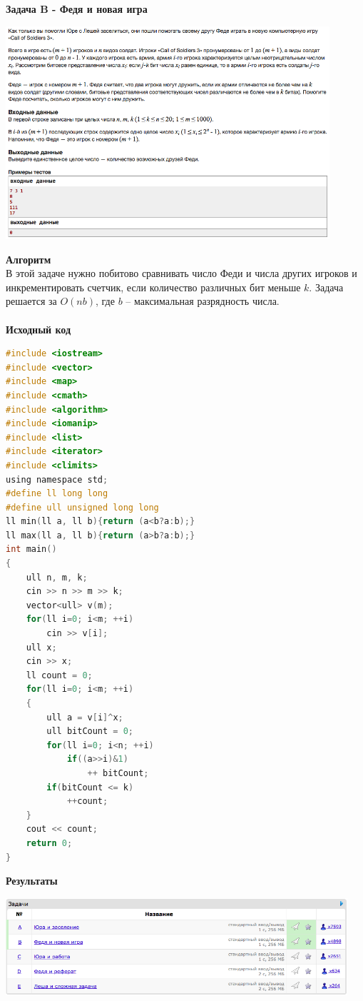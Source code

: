 \documentclass[a4paper,12pt]{article}
\begin{document}
\newpage
\textbf{{\large Задача B - Федя и новая игра}} \\
\begin{center}
\includegraphics[width=0.9\textwidth]{C_267/C_267_B.png}\\ [1cm]
\end{center}
\textbf{{\large Алгоритм}} \\
В этой задаче нужно побитово сравнивать число Феди и числа других игроков и инкрементировать счетчик, если количество различных бит меньше $k$. Задача решается за $O(nb)$, где $b$ -- максимальная разрядность числа.\\ 
\\
\textbf{{\large Исходный код}}
\begin{lstlisting}[language=C]
#include <iostream>
#include <vector>
#include <map>
#include <cmath>
#include <algorithm>
#include <iomanip>
#include <list>
#include <iterator>
#include <climits>
using namespace std;
#define ll long long
#define ull unsigned long long
ll min(ll a, ll b){return (a<b?a:b);}
ll max(ll a, ll b){return (a>b?a:b);}
int main()
{
    ull n, m, k;
    cin >> n >> m >> k;
    vector<ull> v(m);
    for(ll i=0; i<m; ++i)
        cin >> v[i];
    ull x;
    cin >> x;
    ll count = 0;
    for(ll i=0; i<m; ++i)
    {
        ull a = v[i]^x;
        ull bitCount = 0;
        for(ll i=0; i<n; ++i)
            if((a>>i)&1)
                ++ bitCount;
        if(bitCount <= k)
            ++count;
    }
    cout << count;
    return 0;
}
\end{lstlisting}

\textbf{{\large Результаты}} \\
\begin{center}
\includegraphics[width=0.95\textwidth]{C_267/A_C_267_result.png}\\ [1cm]
\end{center}
\end{document}
